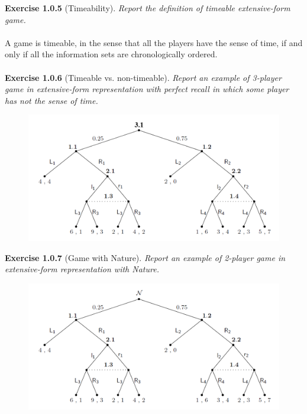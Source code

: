 \noindent
\textbf{Exercise 1.0.5} (Timeability). \textit{Report the definition of timeable extensive-form game.}\\\\
A game is timeable, in the sense that all the players have the sense of time, if and only if all the information sets are chronologically ordered.\\\\
\textbf{Exercise 1.0.6} (Timeable vs. non-timeable). \textit{Report an example of 3-player game in extensive-form representation
with perfect recall in which some player has not the sense of time.}
\begin{figure}[H]
\centering
\includegraphics[width=\textwidth]{images/img_1_1_05.png}
\end{figure}
\noindent
\textbf{Exercise 1.0.7} (Game with Nature). \textit{Report an example of 2-player game in extensive-form representation
with Nature.}
\begin{figure}[H]
\centering
\includegraphics[width=\textwidth]{images/img_1_1_06.png}
\end{figure}
\noindent
